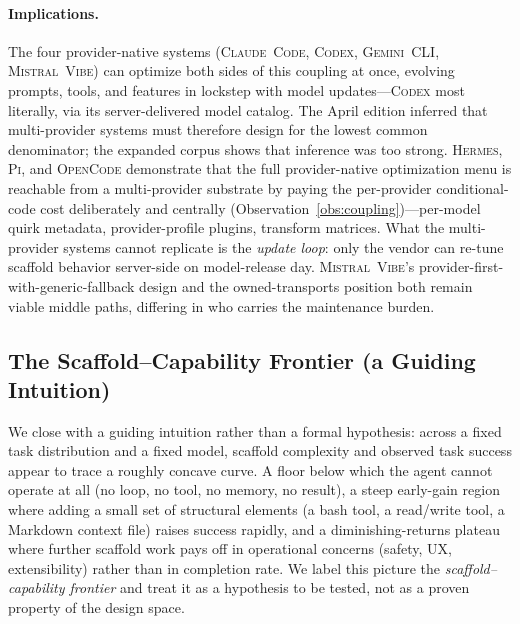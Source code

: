 \documentclass[11pt,a4paper]{article}
\newcommand{\clcode}{\textsc{Claude~Code}\xspace}
\newcommand{\cdx}{\textsc{Codex}\xspace}
\newcommand{\vibe}{\textsc{Mistral~Vibe}\xspace}
\newcommand{\gemini}{\textsc{Gemini~CLI}\xspace}
\newcommand{\hrm}{\textsc{Hermes}\xspace}
\newcommand{\pib}{\textsc{Pi}\xspace}
\newcommand{\ocd}{\textsc{OpenCode}\xspace}
\begin{document}
\paragraph{Implications.}
The four provider-native systems (\clcode{}, \cdx{}, \gemini{}, \vibe{}) can optimize both sides of this coupling at once, evolving prompts, tools, and features in lockstep with model updates---\cdx{} most literally, via its server-delivered model catalog.
The April edition inferred that multi-provider systems must therefore design for the lowest common denominator; the expanded corpus shows that inference was too strong.
\hrm{}, \pib{}, and \ocd{} demonstrate that the full provider-native optimization menu is reachable from a multi-provider substrate by paying the per-provider conditional-code cost deliberately and centrally (Observation~\ref{obs:coupling})---per-model quirk metadata, provider-profile plugins, transform matrices.
What the multi-provider systems cannot replicate is the \emph{update loop}: only the vendor can re-tune scaffold behavior server-side on model-release day.
\vibe{}'s provider-first-with-generic-fallback design and the owned-transports position both remain viable middle paths, differing in who carries the maintenance burden.

\subsection{The Scaffold--Capability Frontier (a Guiding Intuition)}

We close with a guiding intuition rather than a formal hypothesis: across a fixed task distribution and a fixed model, scaffold complexity and observed task success appear to trace a roughly concave curve.
A floor below which the agent cannot operate at all (no loop, no tool, no memory, no result), a steep early-gain region where adding a small set of structural elements (a bash tool, a read/write tool, a Markdown context file) raises success rapidly, and a diminishing-returns plateau where further scaffold work pays off in operational concerns (safety, UX, extensibility) rather than in completion rate.
We label this picture the \emph{scaffold--capability frontier} and treat it as a hypothesis to be tested, not as a proven property of the design space.
\end{document}
